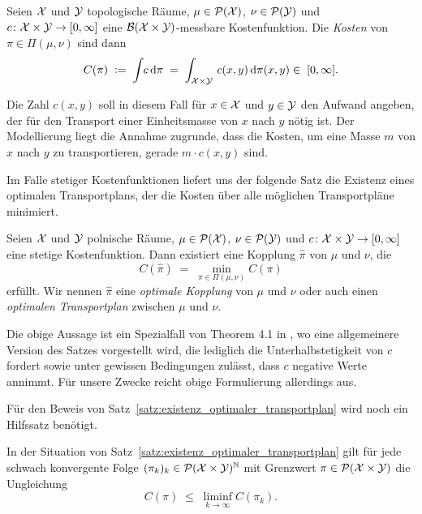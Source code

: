\documentclass[../thesis/thesis.tex]{subfiles}
\begin{document}
	\begin{Definition}
		Seien $\mathcal{X}$ und $\mathcal{Y}$ topologische Räume, $\mu \in \mathcal{P}(\mathcal{X})$, $\nu \in \mathcal{P}(\mathcal{Y})$ und $c \colon \mathcal{X} \times \mathcal{Y} \to [0, \infty]$ eine $\mathcal{B}(\mathcal{X} \times \mathcal{Y})$-messbare Kostenfunktion.
		Die \emph{Kosten} von $\pi \in \Pi(\mu, \nu)$ sind dann
		\[ C(\pi) \; \vcentcolon = \; \int_{} \, c \, \mathrm{d}\pi \; = \; \int_{\mathcal{X} \times \mathcal{Y}} \, c(x, y) \, \mathrm{d}\pi(x, y) \in \; [0, \infty] \text{.} \]
	\end{Definition}

	Die Zahl $c(x, y)$ soll in diesem Fall für $x \in \mathcal{X}$ und $y \in \mathcal{Y}$ den Aufwand angeben, der für den Transport einer Einheitsmasse von $x$ nach $y$ nötig ist. Der Modellierung liegt die Annahme zugrunde, dass 
	die Kosten, um eine Masse $m$ von $x$ nach $y$ zu transportieren, gerade $m\cdot c(x, y)$ sind.
	
	Im Falle stetiger Kostenfunktionen liefert uns der folgende Satz die Existenz eines optimalen Transportplans, der die Kosten über alle möglichen Transportpläne minimiert.

	\begin{Satz}
		\label{satz:existenz_optimaler_transportplan}
		Seien $\mathcal{X}$ und $\mathcal{Y}$ polnische Räume, $\mu \in \mathcal{P}(\mathcal{X})$, $\nu \in \mathcal{P}(\mathcal{Y})$ und $c \colon \mathcal{X} \times \mathcal{Y} \to [0, \infty]$ eine stetige 
		Kostenfunktion. Dann existiert eine Kopplung $\hat{\pi}$ von $\mu$ und $\nu$, die 
		\[ C(\hat{\pi}) \; = \; \min_{\pi \in \Pi(\mu, \nu)} C(\pi) \]
		erfüllt. Wir nennen $\hat{\pi}$ eine \emph{optimale Kopplung} von $\mu$ und $\nu$ oder auch einen \emph{optimalen Transportplan} zwischen $\mu$ und $\nu$.
	\end{Satz}

	\begin{Bemerkung}
		Die obige Aussage ist ein Spezialfall von Theorem 4.1 in \cite{Villani.2009}, wo eine allgemeinere Version des Satzes vorgestellt wird, die lediglich die Unterhalbstetigkeit von $c$ fordert 
		sowie unter gewissen Bedingungen zulässt, dass $c$ negative Werte annimmt. Für unsere Zwecke reicht obige Formulierung allerdings aus.
	\end{Bemerkung}

	Für den Beweis von Satz~\ref{satz:existenz_optimaler_transportplan} wird noch ein Hilfssatz benötigt.

	\begin{Hilfssatz}
		\label{hilfssatz:kostenfunktional_unterhalbstetig}
		In der Situation von Satz~\ref{satz:existenz_optimaler_transportplan} gilt für jede schwach konvergente Folge $(\pi_k)_k \in \mathcal{P}(\mathcal{X} \times \mathcal{Y})^{\mathbb{N}}$ mit Grenzwert $\pi \in \mathcal{P}(\mathcal{X} \times \mathcal{Y})$ die Ungleichung
		\[ C(\pi) \; \leq \; \liminf_{k \to \infty} C(\pi_k) \text{.} \]
	\end{Hilfssatz}
\end{document}
